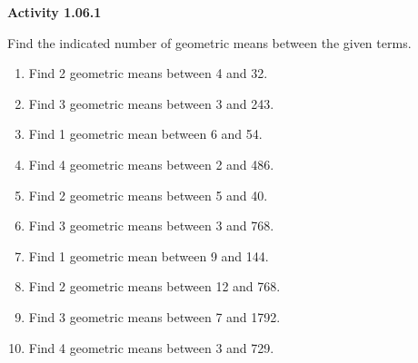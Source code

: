 \vspace{0.3ex}
\noindent\textbf{Activity 1.06.1}

\vspace{0.2ex}

Find the indicated number of geometric means between the given terms.
\begin{enumerate}
    \item Find 2 geometric means between 4 and 32.
    \item Find 3 geometric means between 3 and 243.
    \item Find 1 geometric mean between 6 and 54.
    \item Find 4 geometric means between 2 and 486.
    \item Find 2 geometric means between 5 and 40.
    \item Find 3 geometric means between 3 and 768.
    \item Find 1 geometric mean between 9 and 144.
    \item Find 2 geometric means between 12 and 768.
    \item Find 3 geometric means between 7 and 1792.
    \item Find 4 geometric means between 3 and 729.
\end{enumerate}
